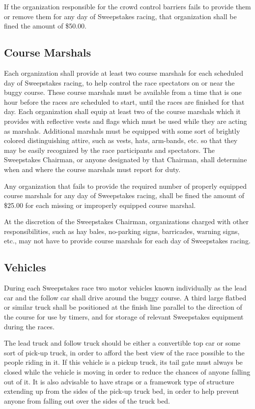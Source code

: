 	If the organization responsible for the crowd control barriers fails to provide
	them or remove them for any day of Sweepstakes racing, that organization shall
	be fined the amount of \$50.00.

\subsection{Course Marshals}

	Each organization shall provide at least two course marshals for each scheduled
	day of Sweepstakes racing, to help control the race spectators on or near the
	buggy course. These course marshals must be available from a time that is one
	hour before the races are scheduled to start, until the races are finished for
	that day. Each organization shall equip at least two of the course marshals
	which it provides with reflective vests and flags which must be used while they
	are acting as marshals. Additional marshals must be equipped with some sort of
	brightly colored distinguishing attire, such as vests, hats, arm-bands, etc. so
	that they may be easily recognized by the race participants and spectators. The
	Sweepstakes Chairman, or anyone designated by that Chairman, shall determine
	when and where the course marshals must report for duty.

	Any organization that fails to provide the required number of properly equipped
	course marshals for any day of Sweepstakes racing, shall be fined the amount of
	\$25.00 for each missing or improperly equipped course marshal.

	At the discretion of the Sweepstakes Chairman, organizations charged with other
	responsibilities, such as hay bales, no-parking signs, barricades, warning
	signs, etc., may not have to provide course marshals for each day of
	Sweepstakes racing.


\subsection{Vehicles}

	During each Sweepstakes race two motor vehicles known individually as the lead
	car and the follow car shall drive around the buggy course. A third large 
	flatbed or similar truck shall be positioned at the finish line parallel to the 
	direction of the course for use by timers, and for storage of relevant Sweepstakes 
	equipment during the races.
	
	The lead truck and follow truck should be either a convertible top car or
	some sort of pick-up truck, in order to afford the best view of the race
	possible to the people riding in it. If this vehicle is a pickup truck, its
	tail gate must always be closed while the vehicle is moving in order to reduce
	the chances of anyone falling out of it. It is also advisable to have straps or
	a framework type of structure extending up from the sides of the pick-up truck
	bed, in order to help prevent anyone from falling out over the sides of the
	truck bed.
	

